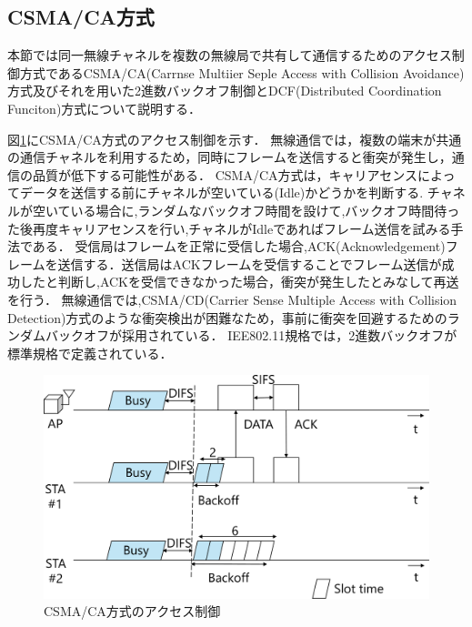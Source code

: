 \documentclass[a4paper,10.5pt]{ltjsarticle}
\begin{document}
\clearpage
\subsection{CSMA/CA方式}
本節では同一無線チャネルを複数の無線局で共有して通信するためのアクセス制御方式であるCSMA/CA(Carrnse Multiier Seple Access with Collision Avoidance)方式及びそれを用いた2進数バックオフ制御とDCF(Distributed Coordination Funciton)方式について説明する．\par
図\ref{fig:CSMA/CA}にCSMA/CA方式のアクセス制御を示す．
無線通信では，複数の端末が共通の通信チャネルを利用するため，同時にフレームを送信すると衝突が発生し，通信の品質が低下する可能性がある．
CSMA/CA方式は，キャリアセンスによってデータを送信する前にチャネルが空いている(Idle)かどうかを判断する.
チャネルが空いている場合に,ランダムなバックオフ時間を設けて,バックオフ時間待った後再度キャリアセンスを行い,チャネルがIdleであればフレーム送信を試みる手法である．
受信局はフレームを正常に受信した場合,ACK(Acknowledgement)フレームを送信する．送信局はACKフレームを受信することでフレーム送信が成功したと判断し,ACKを受信できなかった場合，衝突が発生したとみなして再送を行う．
無線通信では,CSMA/CD(Carrier Sense Multiple Access with Collision Detection)方式のような衝突検出が困難なため，事前に衝突を回避するためのランダムバックオフが採用されている．
IEE802.11規格では，2進数バックオフが標準規格で定義されている．\par
\begin{figure}[H]
  \centering
  \includegraphics[width=\linewidth]{CSMACA.pdf} %
  \caption{CSMA/CA方式のアクセス制御}
  \label{fig:CSMA/CA} %
\end{figure}
\end{document}
